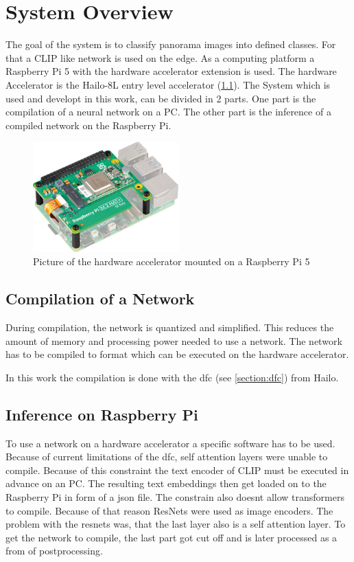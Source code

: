 \chapter{System Overview}

The goal of the system is to classify panorama images into defined classes.
For that a CLIP like network is used on the edge.
As a computing platform a Raspberry Pi 5 with the hardware accelerator extension is used.
The hardware Accelerator is the Hailo-8L entry level accelerator (\cref{fig:overview:aikit}).
The System which is used and developt in this work, can be divided in 2 parts.
One part is the compilation of a neural network on a PC.
The other part is the inference of a compiled network on the Raspberry Pi.

\begin{figure}
    \centering
    \includegraphics[width=0.5\textwidth]{Images/SystemOverview/ai-kit.png}
    \caption{Picture of the hardware accelerator mounted on a Raspberry Pi 5\cite{bildAiKit}}
    \label{fig:overview:aikit}
\end{figure}

\section{Compilation of a Network}

During compilation, the network is quantized and simplified.
This reduces the amount of memory and processing power needed to use a network.
The network has to be compiled to format which can be executed on the hardware accelerator.

In this work the compilation is done with the \Acrlong{dfc} (see \cref{section:dfc}) from Hailo.


\section{Inference on Raspberry Pi}

To use a network on a hardware accelerator a specific software has to be used.
Because of current limitations of the \acrshort{dfc}, self attention layers were unable to compile.
Because of this constraint the text encoder of CLIP must be executed in advance on an PC.
The resulting text embeddings then get loaded on to the Raspberry Pi in form of a json file.
The constrain also doesnt allow transformers to compile.
Because of that reason ResNets were used as image encoders.
The problem with the resnets was, that the last layer also is a self attention layer.
To get the network to compile, the last part got cut off and is later processed as a from of postprocessing.

